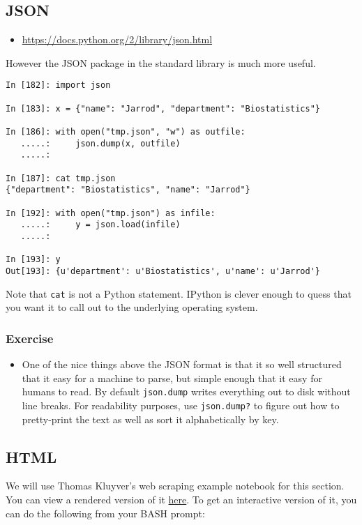\subsection{JSON}
\begin{itemize}
\item \url{https://docs.python.org/2/library/json.html}
\end{itemize}

However the JSON package in the standard library is much more useful.

\begin{verbatim}
In [182]: import json

In [183]: x = {"name": "Jarrod", "department": "Biostatistics"}

In [186]: with open("tmp.json", "w") as outfile: 
   .....:     json.dump(x, outfile)
   .....:     

In [187]: cat tmp.json
{"department": "Biostatistics", "name": "Jarrod"}

In [192]: with open("tmp.json") as infile:
   .....:     y = json.load(infile)
   .....:     

In [193]: y
Out[193]: {u'department': u'Biostatistics', u'name': u'Jarrod'}
\end{verbatim}

Note that \texttt{cat} is not a Python statement.  IPython is clever enough to
quess that you want it to call out to the underlying operating system.

\subsubsection{Exercise}
\begin{itemize}
\item One of the nice things above the JSON format is that it so well
  structured that it easy for a machine to parse, but simple enough
  that it easy for humans to read. By default \texttt{json.dump}
  writes everything out to disk without line breaks.  For readability
  purposes, use \texttt{json.dump?} to figure out how to pretty-print
  the text as well as sort it alphabetically by key.
\end{itemize}
\subsection{HTML}

We will use Thomas Kluyver's web scraping example notebook for this section.
You can view a rendered version of it
\href{http://nbviewer.ipython.org/github/dlab-berkeley/python-fundamentals/blob/master/cheat-sheets/Web-Scraping.ipynb}{here}.
To get an interactive version of it, you can do the following from your BASH prompt:

